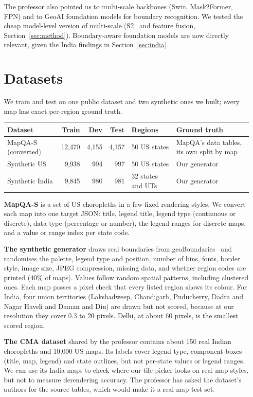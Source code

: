 \documentclass[11pt,a4paper]{article}
\begin{document}
The professor also pointed us to multi-scale backbones (Swin, Mask2Former, FPN) and to GeoAI foundation models for boundary recognition. We tested the cheap model-level version of multi-scale (S2~\cite{s2} and feature fusion, Section~\ref{sec:method}). Boundary-aware foundation models are now directly relevant, given the India findings in Section~\ref{sec:india}.

\section{Datasets}
We train and test on one public dataset and two synthetic ones we built; every map has exact per-region ground truth.

\begin{center}
\small
\begin{tabularx}{\textwidth}{@{}l r r r l L@{}}
\toprule
Dataset & Train & Dev & Test & Regions & Ground truth\\
\midrule
MapQA-S (converted) & 12,470 & 4,155 & 4,157 & 50 US states & MapQA's data tables, its own split by map\\
Synthetic US & 9,938 & 994 & 997 & 50 US states & Our generator\\
Synthetic India & 9,845 & 980 & 981 & 32 states and UTs & Our generator\\
\bottomrule
\end{tabularx}
\end{center}

\textbf{MapQA-S} is a set of US choropleths in a few fixed rendering styles. We convert each map into one target JSON: title, legend title, legend type (continuous or discrete), data type (percentage or number), the legend ranges for discrete maps, and a value or range index per state code.

\textbf{The synthetic generator} draws real boundaries from geoBoundaries~\cite{geoboundaries} and randomises the palette, legend type and position, number of bins, fonts, border style, image size, JPEG compression, missing data, and whether region codes are printed (40\% of maps). Values follow random spatial patterns, including clustered ones. Each map passes a pixel check that every listed region shows its colour. For India, four union territories (Lakshadweep, Chandigarh, Puducherry, Dadra and Nagar Haveli and Daman and Diu) are drawn but not scored, because at our resolution they cover 0.3 to 20 pixels. Delhi, at about 60 pixels, is the smallest scored region.

\textbf{The CMA dataset} shared by the professor contains about 150 real Indian choropleths and 10,000 US maps. Its labels cover legend type, component boxes (title, map, legend) and state outlines, but not per-state values or legend ranges. We can use its India maps to check where our tile picker looks on real map styles, but not to measure derendering accuracy. The professor has asked the dataset's authors for the source tables, which would make it a real-map test set.
\end{document}
